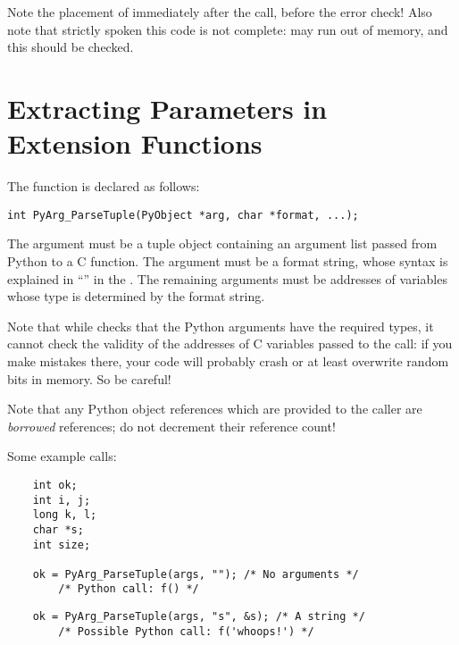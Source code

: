 Note the placement of  immediately after the
call, before the error check!  Also note that strictly spoken this
code is not complete:  may run out of
memory, and this should be checked.


\section{Extracting Parameters in Extension Functions
         \label{parseTuple}}


The  function is declared as follows:

\begin{verbatim}
int PyArg_ParseTuple(PyObject *arg, char *format, ...);
\end{verbatim}

The  argument must be a tuple object containing an argument
list passed from Python to a C function.  The  argument
must be a format string, whose syntax is explained in
``'' in the
.  The
remaining arguments must be addresses of variables whose type is
determined by the format string.

Note that while  checks that the Python
arguments have the required types, it cannot check the validity of the
addresses of C variables passed to the call: if you make mistakes
there, your code will probably crash or at least overwrite random bits
in memory.  So be careful!

Note that any Python object references which are provided to the
caller are \emph{borrowed} references; do not decrement their
reference count!

Some example calls:

\begin{verbatim}
    int ok;
    int i, j;
    long k, l;
    char *s;
    int size;

    ok = PyArg_ParseTuple(args, ""); /* No arguments */
        /* Python call: f() */
\end{verbatim}

\begin{verbatim}
    ok = PyArg_ParseTuple(args, "s", &s); /* A string */
        /* Possible Python call: f('whoops!') */
\end{verbatim}

